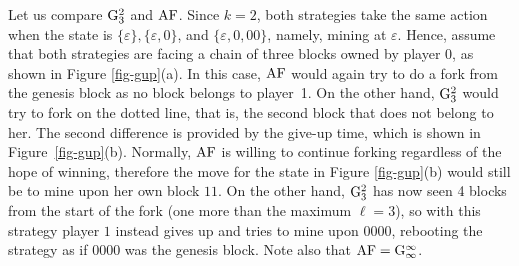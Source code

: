 \documentclass[a4paper,english,cleveref, autoref,numberwithinsect]{lipics-v2019}
\newcommand{\af}{\text{\rm AF}}
\newcommand{\gup}{{\rm {G}}}
\begin{document}
\begin{example}
Let us compare $\gup_3^2$ and $\af$. Since $k = 2$, both strategies take the same action when the state is $\{\varepsilon\}, \{\varepsilon,0\}$, and $\{\varepsilon,0,00\}$, namely, mining at $\varepsilon$. Hence, assume that both strategies are facing a chain of three 
blocks owned by player 0, 
as shown in Figure \ref{fig-gup}(a). In this case, $\af$ would again try to do a fork from the genesis block as no block belongs to player~1. On the other hand, $\gup_3^2$ would try to  fork on the dotted line, that is, the second block that does not belong to her.
The second difference is provided by the give-up time, which is shown in Figure~\ref{fig-gup}(b). Normally, $\af$ is willing to continue forking regardless of the hope of winning, therefore the move for the state in Figure \ref{fig-gup}(b) would still be to mine upon her own block $11$. On the other hand, $\gup_3^2$ has now seen 4 blocks from the start of the fork (one more than the maximum $\ell = 3$), so with this strategy player $1$ instead gives up and tries to mine upon $0000$, rebooting the strategy as if 
$0000$ was the genesis block. Note also that $\af=\gup_\infty^\infty$. 
\end{example}
\end{document}
